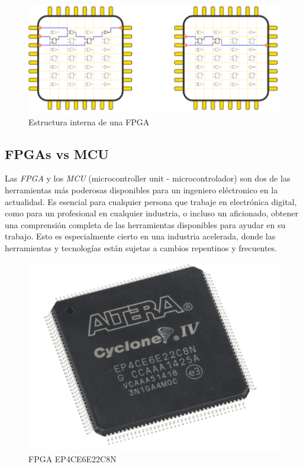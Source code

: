 \begin{figure}[H]
	\center
	\includegraphics[scale=0.6]{imagenes/Herramientas/FPGA.png}
	\caption{Estructura interna de una FPGA}
	\label{fig:Estructura interna de una FPGA}
\end{figure}

\subsection{FPGAs vs MCU}

Las \textit{FPGA} y los \textit{MCU} (microcontroller unit - microcontrolador) son dos de las herramientas más poderosas disponibles para un ingeniero eléctronico en la actualidad. Es esencial para cualquier persona que trabaje en electrónica digital, como para un profesional en cualquier industria, o incluso un aficionado, obtener una comprensión completa de las herramientas disponibles para ayudar en su trabajo. Esto es especialmente cierto en una industria acelerada, donde las herramientas y tecnologías están sujetas a cambios repentinos y frecuentes.\newline

\begin{figure}[H]
	\center
	\includegraphics[scale=0.6]{imagenes/Herramientas/FPGA2.png}
	\caption{FPGA EP4CE6E22C8N}
	\label{fig:FPGA EP4CE6E22C8N}
\end{figure}


